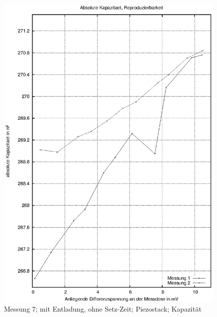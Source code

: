 \documentclass[12pt]{scrreprt} %
\begin{document}
\begin {figure}[htbp]
      \begin{center}
        \includegraphics{tabelle2_2_2}
      \end{center}
\caption{Messung 7; mit Entladung, ohne Setz-Zeit; Piezostack; Kapazität}
\label{fig:2.7}
\end{figure}
\end{document}
